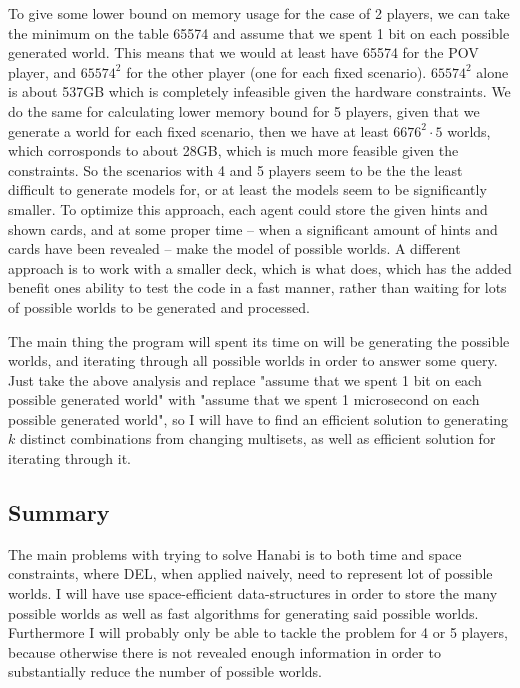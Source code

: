 To give some lower bound on memory usage for the case of 2 players, we can take the minimum on the table 65574 and assume that we spent 1 bit on each possible generated world. This means that we would at least have 65574 for the POV player, and $65574^2$ for the other player (one for each fixed scenario). $65574^2$ alone is about 537GB which is completely infeasible given the hardware constraints. 
We do the same for calculating lower memory bound for 5 players, given that we generate a world for each fixed scenario, then we have at least $6676^2 \cdot 5$ worlds, which corrosponds to about 28GB, which is much more feasible given the constraints.
So the scenarios with 4 and 5 players seem to be the the least difficult to generate models for, or at least the models seem to be significantly smaller.
To optimize this approach, each agent could store the given hints and shown cards, and at some proper time -- when a significant amount of hints and cards have been revealed -- make the model of possible worlds. A different approach is to work with a smaller deck, which is what \cite{EgerAndMartens17} does, which has the added benefit ones ability to test the code in a fast manner, rather than waiting for lots of possible worlds to be generated and processed.

The main thing the program will spent its time on will be generating the possible worlds, and iterating through all possible worlds in order to answer some query. Just take the above analysis and replace "assume that we spent 1 bit on each possible generated world" with "assume that we spent 1 microsecond on each possible generated world", so I will have to find an efficient solution to generating $k$ distinct combinations from changing multisets, as well as efficient solution for iterating through it.

\subsection{Summary}
The main problems with trying to solve Hanabi is to both time and space constraints, where DEL, when applied naively, need to represent lot of possible worlds. 
I will have use space-efficient data-structures in order to store the many possible worlds as well as fast algorithms for generating said possible worlds. 
Furthermore I will probably only be able to tackle the problem for 4 or 5 players, because otherwise there is not revealed enough information in order to substantially reduce the number of possible worlds.
